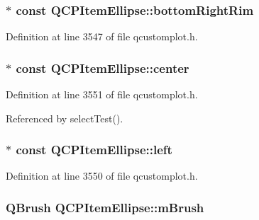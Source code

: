 \hypertarget{class_q_c_p_item_ellipse_a5c8404be601d61b7fafeaaf1c05c4c42}{}
\subsubsection[{bottom\+Right\+Rim}]{$\ast$ const Q\+C\+P\+Item\+Ellipse\+::bottom\+Right\+Rim}\label{class_q_c_p_item_ellipse_a5c8404be601d61b7fafeaaf1c05c4c42}


Definition at line 3547 of file qcustomplot.\+h.

\hypertarget{class_q_c_p_item_ellipse_a8b6dd0e854f99239c5806ffdf2f590b3}{}
\subsubsection[{center}]{$\ast$ const Q\+C\+P\+Item\+Ellipse\+::center}\label{class_q_c_p_item_ellipse_a8b6dd0e854f99239c5806ffdf2f590b3}


Definition at line 3551 of file qcustomplot.\+h.



Referenced by select\+Test().

\hypertarget{class_q_c_p_item_ellipse_aa259cd03efaedf60cf5b1019b20e4f2b}{}
\subsubsection[{left}]{$\ast$ const Q\+C\+P\+Item\+Ellipse\+::left}\label{class_q_c_p_item_ellipse_aa259cd03efaedf60cf5b1019b20e4f2b}


Definition at line 3550 of file qcustomplot.\+h.

\hypertarget{class_q_c_p_item_ellipse_a6fa59478cd3ad1b10e6c1f6cedc84bd6}{}
\subsubsection[{m\+Brush}]{\setlength{\rightskip}{0pt plus 5cm}Q\+Brush Q\+C\+P\+Item\+Ellipse\+::m\+Brush\hspace{0.3cm}{\ttfamily [protected]}}\label{class_q_c_p_item_ellipse_a6fa59478cd3ad1b10e6c1f6cedc84bd6}


